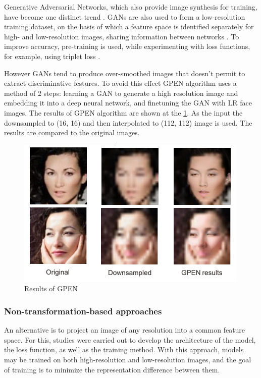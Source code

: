 \documentclass[11pt,a4paper]{article}
\begin{document}
Generative Adversarial Networks, which also provide image synthesis for training, have become one distinct trend \cite{12}. GANs are also used to form a low-resolution training dataset, on the basis of which a feature space is identified separately for high- and low-resolution images, sharing information between networks \cite{13}. To improve accuracy, pre-training is used, while experimenting with loss functions, for example, using triplet loss \cite{14}. 

However GANs tend to produce over-smoothed images that doesn't permit to extract discriminative festures. To avoid this effect GPEN algorithm uses a method of 2 steps: learning a GAN to generate a high resolution image and embedding it into a deep neural network, and finetuning the GAN with LR face images. The results of GPEN \cite{gpen} algorithm are shown at the \ref{fig:super}. As the input the downsampled to (16, 16) and then interpolated to (112, 112) image is used. The results are compared to the original images. 

\begin{figure}[ht!]
    \centering
    \includegraphics[width=\textwidth]{super_resolution.png}
    \caption{Results of GPEN}
    \label{fig:super}
\end{figure}


\subsubsection{Non-transformation-based approaches}
An alternative is to project an image of any resolution into a common feature space. For this, studies were carried out to develop the architecture of the model, the loss function, as well as the training method. With this approach, models may be trained on both high-resolution and low-resolution images, and the goal of training is to minimize the representation difference between them.
\end{document}
